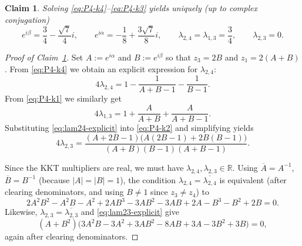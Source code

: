 \documentclass[10pt,a4paper]{amsart}
\newtheorem{claim}{Claim}
\begin{document}
\begin{claim}\label{claim:solve_equations_vv1}
Solving \eqref{eq:P4-k4}--\eqref{eq:P4-k3} yields uniquely (up to complex conjugation)
\[
e^{i\beta}=\frac34-\frac{\sqrt7}{4}i,\qquad
e^{i\alpha}=-\frac18+\frac{3\sqrt7}{8}i,\qquad
\lambda_{2,4}=\lambda_{1,3}=\frac34,\qquad
\lambda_{2,3}=0.
\]    
\end{claim}

\begin{proof}[Proof of Claim~\ref{claim:solve_equations_vv1}]
Set $A:=e^{i\alpha}$ and $B:=e^{i\beta}$ so that $z_3=2B$ and $z_1=2(A+B)$. From \eqref{eq:P4-k4} we obtain an explicit expression for \(\lambda_{2,4}\):
\begin{equation}\label{eq:lam24-explicit}
4\lambda_{2,4}
=1-\frac{1}{A+B-1}-\frac{1}{B-1}.
\end{equation}
From \eqref{eq:P4-k1} we similarly get
\begin{equation}\label{eq:lam13-explicit}
4\lambda_{1,3}
=1+\frac{A}{A+B}+\frac{A}{A+B-1}.
\end{equation}
Substituting \eqref{eq:lam24-explicit} into \eqref{eq:P4-k2} and simplifying yields
\begin{equation}\label{eq:lam23-explicit}
4\lambda_{2,3}
=\frac{(A+2B-1)\bigl(A(2B-1)+2B(B-1)\bigr)}{(A+B)(B-1)(A+B-1)}.
\end{equation}


Since the KKT multipliers are real, we must have
\(\lambda_{2,4},\lambda_{2,3}\in\mathbb R\).
Using \(\overline A=A^{-1}\), \(\overline B=B^{-1}\) (because \(|A|=|B|=1\)),
the condition \(\lambda_{2,4}=\overline{\lambda_{2,4}}\) is equivalent (after clearing denominators,
and using \(B\neq 1\) since \(z_3\neq z_4\)) to
\begin{equation}\label{eq:real-lam24-poly}
2A^2B^2 - A^2B - A^2 + 2AB^3 -3AB^2 -3AB +2A -B^3 -B^2 +2B=0.
\end{equation}
Likewise, \(\lambda_{2,3}=\overline{\lambda_{2,3}}\) and \eqref{eq:lam23-explicit} give
\begin{equation}\label{eq:real-lam23-factor}
(A+B^2)\bigl(3A^2B-3A^2+3AB^2-8AB+3A-3B^2+3B\bigr)=0,
\end{equation}
again after clearing denominators.



\end{proof}
\end{document}
